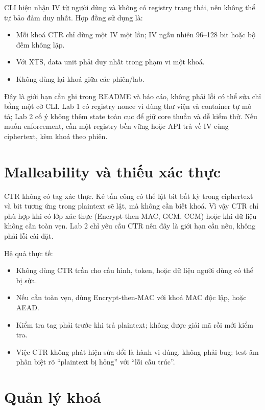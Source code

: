 \documentclass[12pt,a4paper,oneside]{report}
\begin{document}
CLI hiện nhận IV từ người dùng và không có registry trạng thái, nên không thể tự bảo đảm duy nhất. Hợp đồng sử dụng là:


\begin{itemize}[leftmargin=*]
\item Mỗi khoá CTR chỉ dùng một IV một lần; IV ngẫu nhiên 96–128 bit hoặc bộ đếm không lặp.
\item Với XTS, data unit phải duy nhất trong phạm vi một khoá.
\item Không dùng lại khoá giữa các phiên/lab.
\end{itemize}


Đây là giới hạn cần ghi trong README và báo cáo, không phải lỗi có thể sửa chỉ bằng một cờ CLI. Lab 1 có registry nonce vì dùng thư viện và container tự mô tả; Lab 2 cố ý không thêm state toàn cục để giữ core thuần và dễ kiểm thử. Nếu muốn enforcement, cần một registry bền vững hoặc API trả về IV cùng ciphertext, kèm khoá theo phiên.


\section{Malleability và thiếu xác thực}


CTR không có tag xác thực. Kẻ tấn công có thể lật bit bất kỳ trong ciphertext và bit tương ứng trong plaintext sẽ lật, mà không cần biết khoá. Vì vậy CTR chỉ phù hợp khi có lớp xác thực (Encrypt-then-MAC, GCM, CCM) hoặc khi dữ liệu không cần toàn vẹn. Lab 2 chỉ yêu cầu CTR nên đây là giới hạn cần nêu, không phải lỗi cài đặt.


Hệ quả thực tế:


\begin{itemize}[leftmargin=*]
\item Không dùng CTR trần cho cấu hình, token, hoặc dữ liệu người dùng có thể bị sửa.
\item Nếu cần toàn vẹn, dùng Encrypt-then-MAC với khoá MAC độc lập, hoặc AEAD.
\item Kiểm tra tag phải trước khi trả plaintext; không được giải mã rồi mới kiểm tra.
\item Việc CTR không phát hiện sửa đổi là hành vi đúng, không phải bug; test âm phân biệt rõ “plaintext bị hỏng” với “lỗi cấu trúc”.
\end{itemize}


\section{Quản lý khoá}
\end{document}

